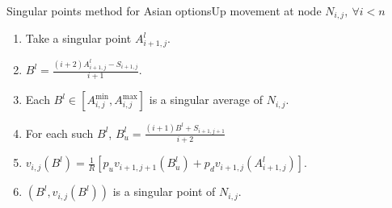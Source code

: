 \documentclass[utf8,t,xcolor=svgnames]{beamer}
\begin{document}
\begin{frame}{Singular points method for Asian options}{Up movement at node $ N_{i,j}, \  \forall i < n $}
	\begin{minipage}[t]{0.6\linewidth}
		\begin{enumerate}
			\item Take a singular point $ A_{i+1,j}^l $.
			\item $ B^l = \frac{ ( i+2) A_{i+1,j}^l - S_{i+1,j} }{ i+1 } $.
			\item Each $ B^l \in \left[ A_{i,j}^{\min}, A_{i,j}^{\max} \right] $ is a singular average of $ N_{i,j} $.
			\item For each such $ B^l $, $ B^l_u = \frac{(i+1) B^l + S_{i+1,j+1}}{i+2} $
			\item $ v_{i,j}( B^l ) = \frac{1}{R} \left[ p_u v_{i+1,j+1} \left( B^l_u \right) + p_d v_{i+1,j} \left( A_{i+1,j}^l \right) \right] $.
			\item $ \left( B^l, v_{i,j}( B^l ) \right) $ is a singular point of $ N_{i,j} $.
		\end{enumerate}
	\end{minipage}
	\begin{minipage}[t]{0.3\linewidth}
		\begin{figure}
		\end{figure}
	\end{minipage}
\end{frame}
\end{document}
